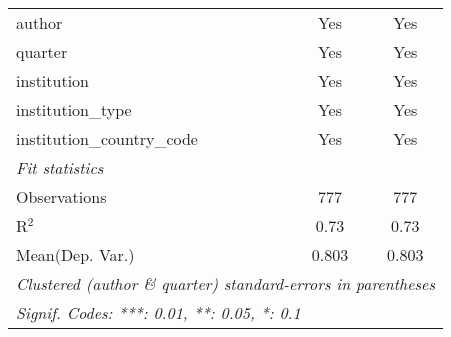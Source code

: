 \begin{tabular}{lcc}
   author                                   & Yes     & Yes\\  
   quarter                                  & Yes     & Yes\\  
   institution                              & Yes     & Yes\\  
   institution\_type                        & Yes     & Yes\\  
   institution\_country\_code               & Yes     & Yes\\  
   \midrule
   \emph{Fit statistics}\\
   Observations                             & 777     & 777\\  
   R$^2$                                    & 0.73    & 0.73\\  
Mean(Dep. Var.) & 0.803 & 0.803 \\
   \midrule \midrule
   \multicolumn{3}{l}{\emph{Clustered (author \& quarter) standard-errors in parentheses}}\\
   \multicolumn{3}{l}{\emph{Signif. Codes: ***: 0.01, **: 0.05, *: 0.1}}\\
\end{tabular}
\par\endgroup

